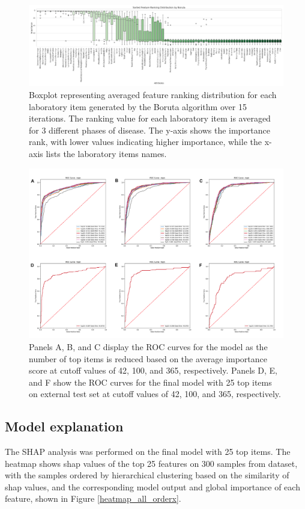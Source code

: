 \documentclass[final,3p,times,authoryear]{elsarticle}
\begin{document}
\begin{figure}[t] 
    \centering
    \includegraphics[width=\textwidth]{figures/boruta_by_group.png} 
    \caption{Boxplot representing averaged feature ranking distribution for each laboratory item generated by the Boruta algorithm over 15 iterations. The ranking value for each laboratory item is averaged for 3 different phases of disease. The y-axis shows the importance rank, with lower values indicating higher importance, while the x-axis lists the laboratory items names.}\label{boruta_by_group}
\end{figure}


\begin{figure}[t]  
    \centering 
    \includegraphics[width=\textwidth]{figures/topn_extval25.png} 
    \caption{Panels A, B, and C display the ROC curves for the model as the number of top items is reduced based on the average importance score at cutoff values of 42, 100, and 365, respectively. Panels D, E, and F show the ROC curves for the final model with 25 top items on external test set at cutoff values of 42, 100, and 365, respectively.}\label{topn_extval25}

\end{figure}


\subsection{Model explanation}\label{ModelExplanationResults}
The SHAP analysis was performed on the final model with 25 top items. The heatmap shows shap values of the top 25 features on 300 samples from dataset, with the samples ordered by hierarchical clustering based on the similarity of shap values, and the corresponding model output and global importance of each feature, shown in Figure \ref{heatmap_all_orderx}. 
\end{document}
